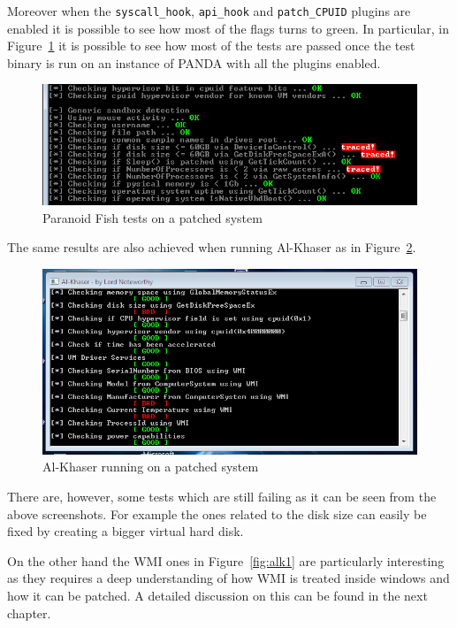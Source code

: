 Moreover when the \lstinline{syscall_hook}, \lstinline{api_hook} and \lstinline{patch_CPUID} plugins are enabled it is possible to see how most of the flags turns to green. In particular, in Figure~\ref{fig:res1} it is possible to see how most of the tests are passed once the test binary is run on an instance of PANDA with all the plugins enabled.

\begin{figure}[htp]
    \centering
    \includegraphics[width=\linewidth]{images/par2.png}%
    \caption{Paranoid Fish tests on a patched system}%
    \label{fig:res1}%
\end{figure}

The same results are also achieved when running Al-Khaser as in Figure~\ref{fig:alk2}.

\begin{figure}[htp]
    \centering
    \includegraphics[width=\linewidth]{images/al2.png}%
    \caption{Al-Khaser running on a patched system}%
    \label{fig:alk2}%
\end{figure}


There are, however, some tests which are still failing as it can be seen from the above screenshots. For example the ones related to the disk size can easily be fixed by creating a bigger virtual hard disk.

On the other hand the WMI ones in Figure~\ref{fig:alk1} are particularly interesting as they requires a deep understanding of how WMI is treated inside windows and how it can be patched. A detailed discussion on this can be found in the next chapter. 

